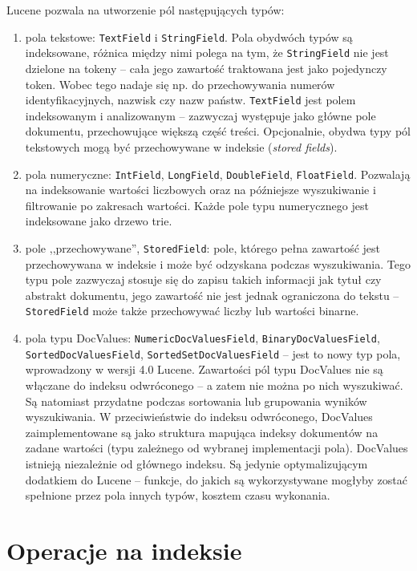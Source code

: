 Lucene pozwala na utworzenie pól następujących typów:
\begin{enumerate}
 \item pola tekstowe: \texttt{TextField} i \texttt{StringField}. Pola obydwóch typów są indeksowane, różnica między nimi polega na tym, że \texttt{StringField} nie jest dzielone na tokeny -- cała jego zawartość traktowana jest jako pojedynczy token. Wobec tego nadaje się np. do przechowywania numerów identyfikacyjnych, nazwisk czy nazw państw. \texttt{TextField} jest polem indeksowanym i analizowanym -- zazwyczaj występuje jako główne pole dokumentu, przechowujące większą część treści. Opcjonalnie, obydwa typy pól tekstowych mogą być przechowywane w indeksie (\emph{stored fields}).
 \item pola numeryczne: \texttt{IntField}, \texttt{LongField}, \texttt{DoubleField}, \texttt{FloatField}. Pozwalają na indeksowanie wartości liczbowych oraz na późniejsze wyszukiwanie i filtrowanie po zakresach wartości. Każde pole typu numerycznego jest indeksowane jako drzewo trie.
 \item pole ,,przechowywane'', \texttt{StoredField}: pole, którego pełna zawartość jest przechowywana w indeksie i może być odzyskana podczas wyszukiwania. Tego typu pole zazwyczaj stosuje się do zapisu takich informacji jak tytuł czy abstrakt dokumentu, jego zawartość nie jest jednak ograniczona do tekstu -- \texttt{StoredField} może także przechowywać liczby lub wartości binarne.
 \item pola typu DocValues: \texttt{NumericDocValuesField}, \texttt{BinaryDocValuesField}, \texttt{SortedDocValuesField}, \texttt{SortedSetDocValuesField} -- jest to nowy typ pola, wprowadzony w wersji 4.0 Lucene. Zawartości pól typu DocValues nie są włączane do indeksu odwróconego -- a zatem nie można po nich wyszukiwać. Są natomiast przydatne podczas sortowania lub grupowania wyników wyszukiwania. W przeciwieństwie do indeksu odwróconego, DocValues zaimplementowane są jako struktura mapująca indeksy dokumentów na zadane wartości (typu zależnego od wybranej implementacji pola). DocValues istnieją niezależnie od głównego indeksu. Są jedynie optymalizującym dodatkiem do Lucene -- funkcje, do jakich są wykorzystywane mogłyby zostać spełnione przez pola innych typów, kosztem czasu wykonania. 
\end{enumerate}

\section{Operacje na indeksie}

